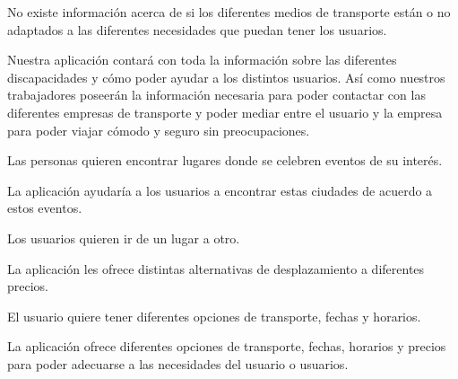\vspace{0.5cm}

\begin{problema}

      No existe información acerca de si los diferentes medios de transporte están o
      no adaptados a las diferentes necesidades que puedan tener los usuarios.

            {\centering
                  \begin{vision}\justifying\noindent
                        Nuestra aplicación contará con toda la información sobre las diferentes discapacidades y cómo poder ayudar a los distintos usuarios. Así como nuestros trabajadores poseerán la información necesaria para poder contactar con las diferentes empresas de transporte y poder mediar entre el usuario y la empresa para poder viajar cómodo y seguro sin preocupaciones.

                  \end{vision}}
\end{problema}

\vspace{0.5cm}

\begin{problema}

      Las personas quieren encontrar lugares donde se celebren eventos de su interés.

      {\centering
      \begin{vision}\justifying\noindent
            La aplicación ayudaría a los usuarios a encontrar estas ciudades de acuerdo a estos eventos.
      \end{vision}}
\end{problema}

\vspace{0.5cm}

\begin{problema}

      Los usuarios quieren ir de un lugar a otro.

            {\centering
                  \begin{vision}\justifying\noindent
                        La aplicación les ofrece distintas alternativas de desplazamiento a diferentes precios.
                  \end{vision}}
\end{problema}

\vspace{0.5cm}

\begin{problema}

      El usuario quiere tener diferentes opciones de transporte, fechas y horarios.

            {\centering
                  \begin{vision}\justifying\noindent
                        La aplicación ofrece diferentes opciones de transporte, fechas, horarios y precios para poder adecuarse a las necesidades del usuario o usuarios.
                  \end{vision}}
\end{problema}

